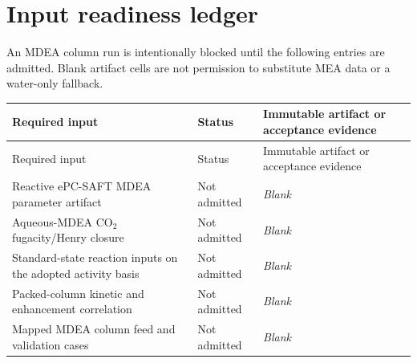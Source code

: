 \section{Input readiness ledger}

An MDEA column run is intentionally blocked until the following entries are admitted. Blank
artifact cells are not permission to substitute MEA data or a water-only fallback.

\begin{longtable}{>{\raggedright\arraybackslash}p{} >{\raggedright\arraybackslash}p{} >{\raggedright\arraybackslash}p{}}
\toprule
Required input & Status & Immutable artifact or acceptance evidence \\
\midrule
\endfirsthead
\toprule
Required input & Status & Immutable artifact or acceptance evidence \\
\midrule
\endhead
Reactive ePC-SAFT MDEA parameter artifact & Not admitted & \textit{Blank} \\
Aqueous-MDEA CO$_2$ fugacity/Henry closure & Not admitted & \textit{Blank} \\
Standard-state reaction inputs on the adopted activity basis & Not admitted & \textit{Blank} \\
Packed-column kinetic and enhancement correlation & Not admitted & \textit{Blank} \\
Mapped MDEA column feed and validation cases & Not admitted & \textit{Blank} \\
\bottomrule
\end{longtable}
